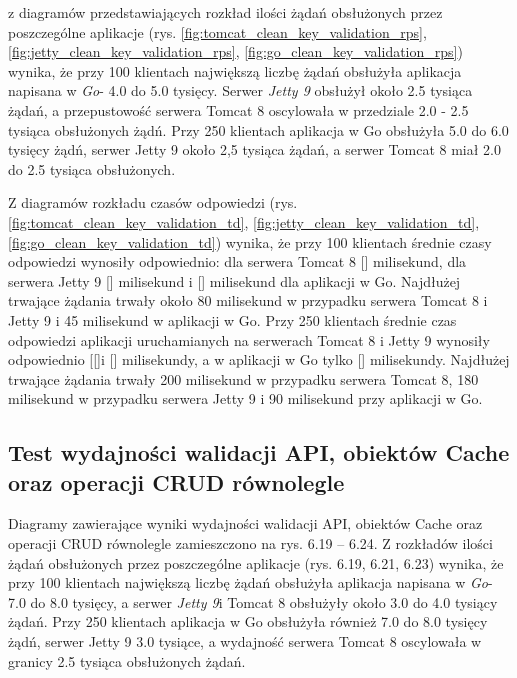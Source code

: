  z diagramów przedstawiających rozkład ilości żądań obsłużonych przez poszczególne aplikacje  (rys. \ref{fig:tomcat_clean_key_validation_rps}, \ref{fig:jetty_clean_key_validation_rps}, \ref{fig:go_clean_key_validation_rps}) wynika, że przy 100 klientach największą liczbę żądań  obsłużyła aplikacja napisana w \textsl{Go}- 4.0 do 5.0 tysięcy. Serwer \textsl{Jetty 9} obsłużył około 2.5 tysiąca  żądań, a przepustowość serwera Tomcat 8 oscylowała w przedziale 2.0 - 2.5 tysiąca obsłużonych żądń. Przy 250 klientach aplikacja w Go obsłużyła 5.0 do 6.0 tysięcy żądń, serwer Jetty 9 około 2,5 tysiąca żądań, a serwer Tomcat 8 miał 2.0 do 2.5 tysiąca obsłużonych. 
 
Z diagramów rozkładu czasów odpowiedzi (rys. \ref{fig:tomcat_clean_key_validation_td}, \ref{fig:jetty_clean_key_validation_td}, \ref{fig:go_clean_key_validation_td}) wynika, że przy 100 klientach średnie czasy odpowiedzi wynosiły odpowiednio: dla serwera Tomcat 8 [] milisekund, dla serwera Jetty 9 [] milisekund i [] milisekund dla aplikacji w Go.  Najdłużej trwające żądania trwały około 80 milisekund w przypadku serwera Tomcat 8 i Jetty 9 i 45 milisekund  w aplikacji w Go. Przy 250 klientach średnie czas odpowiedzi aplikacji uruchamianych na serwerach Tomcat 8 i Jetty 9  wynosiły  odpowiednio [[]i [] milisekundy, a w aplikacji w Go tylko [] milisekundy. Najdłużej trwające żądania trwały 200 milisekund w przypadku serwera Tomcat 8, 180 milisekund w przypadku serwera Jetty 9 i 90 milisekund przy aplikacji w Go. 


\clearpage

\subsection{Test wydajności walidacji API, obiektów Cache oraz operacji CRUD równolegle}
Diagramy zawierające wyniki wydajności walidacji API, obiektów Cache oraz operacji CRUD równolegle zamieszczono na rys. 6.19 – 6.24.                                                                                            
Z rozkładów ilości żądań obsłużonych  przez poszczególne aplikacje (rys. 6.19, 6.21, 6.23) wynika, że przy 100 klientach największą liczbę żądań  obsłużyła aplikacja napisana w \textsl{Go}- 7.0 do 8.0 tysięcy, a serwer \textsl{Jetty 9}i Tomcat 8 obsłużyły około 3.0 do 4.0  tysiący żądań. Przy 250 klientach aplikacja w Go obsłużyła również 7.0 do 8.0 tysięcy żądń, serwer Jetty 9 3.0 tysiące, a wydajność serwera Tomcat 8 oscylowała w granicy 2.5 tysiąca obsłużonych żądań. 
 
